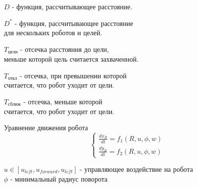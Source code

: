 \noindent$ D $ - функция, рассчитывающее расстояние.

\noindent$ D^* $ - функция, рассчитывающее расстояние\\
для нескольких роботов и целей.

\noindent$ T_{\text{цели}} $ - отсечка расстояния до цели,\\
меньше которой цель считается захваченной.

\noindent$ T_{\text{откл}} $ - отсечка, при превышении которой\\
считается, что робот уходит от цели.

\noindent$ T_{\text{сближ}} $ - отсечка, меньше которой\\
считается, что робот уходит от цели.

Уравнение движения робота
$$
\begin{cases}
\frac{dx_R}{dt} = f_1(R, u, \phi, w) \\
\frac{dy_R}{dt} = f_2(R, u, \phi, w) 
\end{cases}
$$

\noindent$ u \in [u_{left}, u_{forward}, u_{left}]$ - управляющее воздействие на робота\\
\noindent $ \phi $ - минимальный радиус поворота\\
